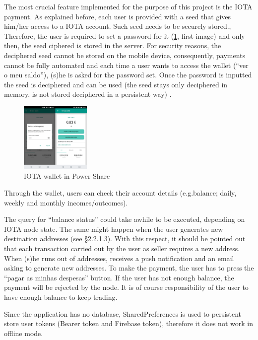 The most crucial feature implemented for the purpose of this project is the IOTA payment. As explained before, each user is provided with a seed that gives him/her access to a IOTA account. Such seed needs to be securely stored.,  Therefore, the user is required to set a password for it (\cref{fig:ps11}, first image) and only then, the seed ciphered is stored in the server. For security reasons, the deciphered seed cannot be stored on the mobile device, consequently, payments cannot be fully automated and each time a user wants to access the wallet (“ver o meu saldo”), (s)he is asked for the password set. Once the password is inputted the seed is deciphered and can be used (the seed stays only deciphered in memory, is not stored deciphered in a persistent way) .


\begin{figure}[h]
\centering
\includegraphics[width=0.3\textwidth]{./Images/ps11}
\caption{IOTA wallet in Power Share}
\label{fig:ps11}
\end{figure}

Through the wallet, users can check their account details (e.g.balance; daily, weekly and monthly incomes/outcomes).



The query for “balance status” could take awhile to be executed, depending on IOTA node state. The same might happen when the user generates  new destination addresses (see §2.2.1.3). With this respect, it should be pointed out that each transaction carried out by the user as seller requires a new address. When (s)he runs out of addresses, receives a push notification and an email asking to generate new addresses. To make the payment, the user has to press the “pagar as minhas despesas” button. If the user has not enough balance, the payment will be rejected by the node. It is of course responsibility of the user to have enough balance to keep trading.


Since the application has no database, SharedPreferences is used to persistent store user tokens (Bearer token and Firebase token), therefore it does not work in offline mode. 


